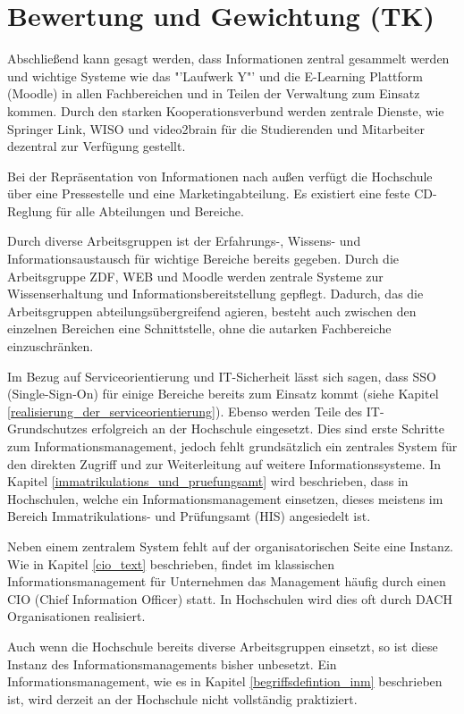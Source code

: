 \section{Bewertung und Gewichtung (TK)}
Abschließend kann gesagt werden, dass Informationen zentral gesammelt werden und 
wichtige Systeme wie das "'Laufwerk Y"' und die E-Learning Plattform (Moodle) in allen 
Fachbereichen und in Teilen der Verwaltung zum Einsatz kommen. Durch den starken 
Kooperationsverbund werden zentrale Dienste, wie Springer Link, WISO und video2brain für 
die Studierenden und Mitarbeiter dezentral zur Verfügung gestellt. 

Bei der Repräsentation von Informationen nach außen verfügt die Hochschule über eine 
Pressestelle und eine Marketingabteilung. Es existiert eine feste CD-Reglung für alle 
Abteilungen und Bereiche. 

Durch diverse Arbeitsgruppen ist der Erfahrungs-, Wissens- und Informationsaustausch für 
wichtige Bereiche bereits gegeben. Durch die Arbeitsgruppe ZDF, WEB und Moodle werden 
zentrale Systeme zur Wissenserhaltung und Informationsbereitstellung gepflegt. Dadurch, 
das die Arbeitsgruppen abteilungsübergreifend agieren, besteht auch zwischen den 
einzelnen Bereichen eine Schnittstelle, ohne die autarken Fachbereiche einzuschränken. 

Im Bezug auf Serviceorientierung und IT-Sicherheit lässt sich sagen, dass SSO 
(Single-Sign-On) für einige Bereiche bereits zum Einsatz kommt (siehe Kapitel \ref{realisierung_der_serviceorientierung}). 
Ebenso werden Teile des IT-Grundschutzes erfolgreich an der Hochschule eingesetzt. Dies 
sind erste Schritte zum Informationsmanagement, jedoch fehlt grundsätzlich ein zentrales 
System für den direkten Zugriff und zur Weiterleitung auf weitere Informationssysteme. In 
Kapitel \ref{immatrikulations_und_pruefungsamt} wird beschrieben, dass in Hochschulen, 
welche ein Informationsmanagement einsetzen, dieses meistens im Bereich 
Immatrikulations- und Prüfungsamt (HIS) angesiedelt ist. 

Neben einem  zentralem System fehlt auf der organisatorischen Seite eine Instanz. Wie in 
Kapitel \ref{cio_text} beschrieben, findet im klassischen Informationsmanagement für 
Unternehmen das Management häufig durch einen CIO (Chief Information Officer) statt. In 
Hochschulen wird dies oft durch DACH Organisationen realisiert. 

Auch wenn die Hochschule bereits diverse Arbeitsgruppen einsetzt, so ist diese Instanz des 
Informationsmanagements bisher unbesetzt. Ein Informationsmanagement, wie es in Kapitel 
\ref{begriffsdefintion_inm} beschrieben ist, wird derzeit an der Hochschule nicht vollständig 
praktiziert.